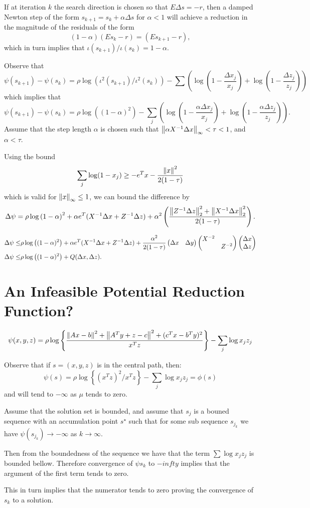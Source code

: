 \documentclass{article}
\begin{document}
If at iteration $k$ the search direction is chosen so that $E\Delta s = -r$, then
a damped Newton step of the form $s_{k+1} = s_k + \alpha \Delta s$ for $\alpha <1$ 
will achieve a reduction in the magnitude of the residuals of the form 
\[
(1-\alpha)(Es_k-r) = (Es_{k+1}-r),
\]
which in turn implies that $\iota(s_{k+1})/\iota(s_k) = 1-\alpha$. 

Observe that 
\[ \psi(s_{k+1}) - \psi(s_k) =
\rho \log\left( \iota^2(s_{k+1})/\iota^2(s_k) \right) 
- \sum\left( \log\left( 1-\frac{\Delta x_j}{x_j} \right) 
+ \log\left(1-\frac{\Delta z_j}{z_j} \right) \right)
\]
which implies that 
\[
\psi(s_{k+1}) - \psi(s_k) = 
\rho \log\left( (1-\alpha)^2 \right) 
- \sum_j\left( \log\left( 1-\frac{\alpha \Delta x_j}{x_j} \right) 
+ \log\left(1-\frac{\alpha \Delta z_j}{z_j} \right) \right).
\]
Assume that the step length $\alpha$ is chosen such that $\left\| \alpha X^{-1}\Delta x \right\|_\infty < \tau < 1$, 
and $\alpha < \tau$.

Using the bound \cite{Kojima}
\[
\sum_j \log(1-x_j) \geq -e^Tx-\frac{\left\| x \right\|^2}{2(1-\tau)}
\]
which is valid for $\left\| x \right\|_\infty\leq1$,   
we can bound the difference by 
\[ 
\Delta \psi = \rho \log\left( 1-\alpha \right)^2 + \alpha e^T(X^{-1}\Delta x
+ Z^{-1}\Delta z) + \alpha^2\left( \frac{\left\| Z^{-1}\Delta z \right\|_2^2+\left\| X^{-1}\Delta
x \right\|_2^2}{2(1-\tau)} \right).
\]

\begin{eqnarray*}
  \Delta \psi \leq& \rho \log \left( (1-\alpha)^2 \right) + \alpha e^T(X^{-1}\Delta x + Z^{-1}\Delta z) + \frac{\alpha^2}{2(1-\tau)} 
  \begin{pmatrix}\Delta x & \Delta y\end{pmatrix} \begin{pmatrix}X^{-2} & \\ & Z^{-2}\end{pmatrix}\begin{pmatrix}\Delta x \\ \Delta z\end{pmatrix} \\
  \Delta \psi \leq& \rho \log \left( (1-\alpha)^2 \right) + Q(\Delta x, \Delta z).
\end{eqnarray*}

\section{An Infeasible Potential Reduction Function?}

\[
\psi(x,y,z) = \rho \log\left\{ \frac{\left\| Ax-b \right\|^2 + \left\| A^Ty+z-c \right\|^2 + (c^Tx-b^Ty)^2}{x^Tz} \right\} - \sum_j\log{x_jz_j}
\]

Observe that if $s = (x,y,z)$ is in the central path, then:
\[
\psi(s) = \rho \log\left\{ (x^Tz)^2/x^Tz \right\} - \sum_j \log{x_jz_j} = \phi(s)
\]
and will tend to $-\infty$ as $\mu$ tends to zero.

Assume that the solution set is bounded, and assume that $s_j$ is a bouned
sequence with an accumulation point $s^\star$ such that for some sub sequence
$s_{j_k}$ we have $\psi(s_{j_k})\rightarrow -\infty $ as $k\rightarrow \infty$.

Then from the boundedness of the sequence we have that the term $\sum\log{x_jz_j}$ is 
bounded bellow. Therefore convergence of $\psi{s_k}$ to $-infty$ implies
that the argument of the first term tends to zero.

This in turn implies that the numerator tends to zero proving the convergence of $s_k$ to a solution.
\end{document}
